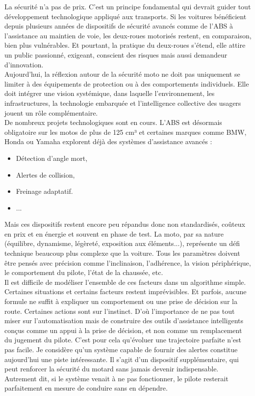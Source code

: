 La sécurité n’a pas de prix. C’est un principe fondamental qui devrait guider tout développement technologique appliqué aux transports. Si les voitures bénéficient depuis plusieurs années de dispositifs de sécurité avancés comme de l’ABS à l’assistance au maintien de voie, les deux-roues motorisés restent, en comparaison, bien plus vulnérables. Et pourtant, la pratique du deux-roues s’étend, elle attire un public passionné, exigeant, conscient des risques mais aussi demandeur d’innovation.\\
Aujourd’hui, la réflexion autour de la sécurité moto ne doit pas uniquement se limiter à des équipements de protection ou à des comportements individuels. Elle doit intégrer une vision systémique, dans laquelle l’environnement, les infrastructures, la technologie embarquée et l’intelligence collective des usagers jouent un rôle complémentaire.\\
De nombreux projets technologiques sont en cours. L’ABS est désormais obligatoire sur les motos de plus de 125 cm³ et certaines marques comme BMW, Honda ou Yamaha explorent déjà des systèmes d’assistance avancés : 
\begin{itemize}
	\item Détection d’angle mort,
	\item Alertes de collision,
	\item Freinage adaptatif.
	\item ...
\end{itemize}
Mais ces dispositifs restent encore peu répandus donc non standardisés, coûteux en prix et en énergie et souvent en phase de test. La moto, par sa nature (équilibre, dynamisme, légèreté, exposition aux éléments...), représente un défi technique beaucoup plus complexe que la voiture. Tous les paramètres doivent être pensés avec précision comme l'inclinaison, l'adhérence, la vision périphérique, le comportement du pilote, l'état de la chaussée, etc.\\
Il est difficile de modéliser l’ensemble de ces facteurs dans un algorithme simple. Certaines situations et certains facteurs restent imprévisibles. Et parfois, aucune formule ne suffit à expliquer un comportement ou une prise de décision sur la route. Certaines actions sont sur l'instinct. D’où l’importance de ne pas tout miser sur l’automatisation mais de construire des outils d’assistance intelligents conçus comme un appui à la prise de décision, et non comme un remplacement du jugement du pilote. C'est pour cela qu'évoluer une trajectoire parfaite n'est pas facile. Je considère qu’un système capable de fournir des alertes constitue aujourd’hui une piste intéressante. Il s’agit d’un dispositif supplémentaire, qui peut renforcer la sécurité du motard sans jamais devenir indispensable. Autrement dit, si le système venait à ne pas fonctionner, le pilote resterait parfaitement en mesure de conduire sans en dépendre.\\
